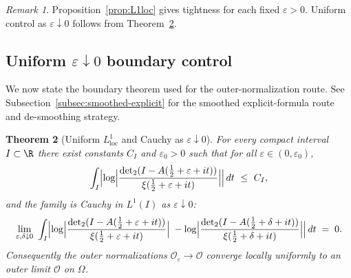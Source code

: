 \documentclass[11pt]{article}
\newtheorem{theorem}{Theorem}
\theoremstyle{remark}
\newtheorem{remark}[theorem]{Remark}
\DeclareMathOperator{\dettwo}{det_2}
\begin{document}
\begin{remark}
Proposition~\ref{prop:L1loc} gives tightness for each fixed \(\varepsilon>0\). Uniform control as \(\varepsilon\downarrow 0\) follows from Theorem~\ref{thm:uniform-eps}.
\end{remark}

\subsection{Uniform \(\varepsilon\downarrow 0\) boundary control}\label{subsec:uniform-eps}
We now state the boundary theorem used for the outer-normalization route. See Subsection~\ref{subsec:smoothed-explicit} for the smoothed explicit-formula route and de-smoothing strategy.

\begin{theorem}[Uniform $L^1_{\mathrm{loc}}$ and Cauchy as \(\varepsilon\downarrow 0\)]\label{thm:uniform-eps}
For every compact interval $I\subset\R$ there exist constants $C_I$ and \(\varepsilon_0>0\) such that for all \(\varepsilon\in(0,\varepsilon_0)\),
\[
 \int_I \Bigl|\log\Bigl|\frac{\dettwo(I-A(\tfrac12+\varepsilon+it))}{\xi(\tfrac12+\varepsilon+it)}\Bigr|\Bigr|\,dt\ \le\ C_I,
\]
and the family is Cauchy in $L^1(I)$ as \(\varepsilon\downarrow 0\):
\[
 \lim_{\substack{\varepsilon,\delta\downarrow 0}}\ \int_I \Bigl|\log\Bigl|\frac{\dettwo(I-A(\tfrac12+\varepsilon+it))}{\xi(\tfrac12+\varepsilon+it)}\Bigr|\;-
 \log\Bigl|\frac{\dettwo(I-A(\tfrac12+\delta+it))}{\xi(\tfrac12+\delta+it)}\Bigr|\Bigr|\,dt\;=\;0.
\]
Consequently the outer normalizations \(\mathcal O_{\varepsilon}\to \mathcal O\) converge locally uniformly to an outer limit \(\mathcal O\) on \(\Omega\).
\end{theorem}
\end{document}
